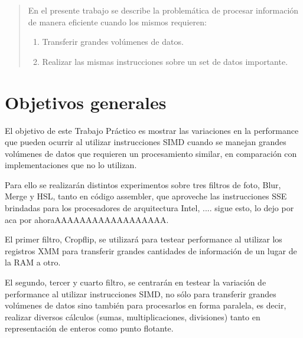 \documentclass[a4paper]{article}
\begin{document}
\thispagestyle{empty}

\maketitle
\newpage

\thispagestyle{empty}
\vfill
\begin{abstract}
En el presente trabajo se describe la problemática de procesar información de manera eficiente cuando los mismos requieren:
\begin{enumerate}
\item Transferir grandes volúmenes de datos.
\item Realizar las mismas instrucciones sobre un set de datos importante.
\end{enumerate}
\end{abstract}
\thispagestyle{empty}
\vspace{3cm}
\tableofcontents
\newpage

\section{Objetivos generales}
El objetivo de este Trabajo Práctico es mostrar las variaciones en la performance que pueden ocurrir al utilizar instrucciones SIMD cuando se manejan grandes volúmenes de datos que requieren un procesamiento similar, en comparación con implementaciones que no lo utilizan.

Para ello se realizarán distintos experimentos sobre tres filtros de foto, Blur, Merge y HSL, tanto en código assembler, que aproveche las instrucciones SSE brindadas para los procesadores de arquitectura Intel, .... sigue esto, lo dejo por aca por ahoraAAAAAAAAAAAAAAAAAA.

El primer filtro, Cropflip, se utilizará para testear performance al utilizar los registros XMM para transferir grandes cantidades de información de un lugar de la RAM a otro.

El segundo, tercer y cuarto filtro, se centrarán en testear la variación de performance al utilizar instrucciones SIMD, no sólo para transferir grandes volúmenes de datos sino también para procesarlos en forma paralela, es decir, realizar diversos cálculos (sumas, multiplicaciones, divisiones) tanto en representación de enteros como punto flotante.
\newpage
\end{document}
